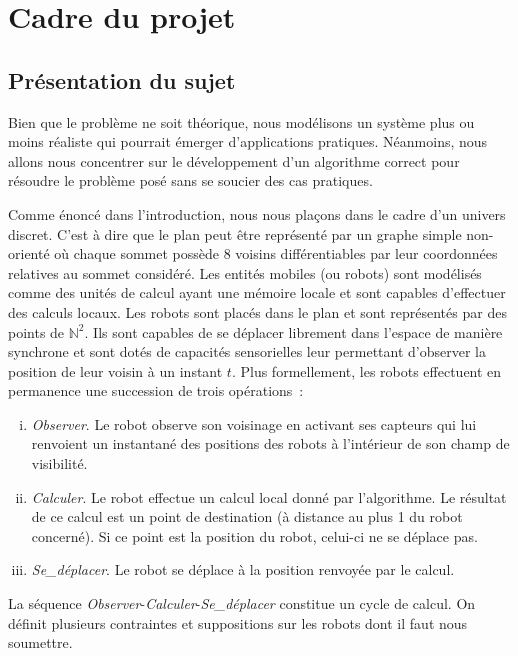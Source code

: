 \newcommand{\Observer}{\textit{Observer}\xspace}
\newcommand{\Calculer}{\textit{Calculer}\xspace}
\newcommand{\SeDeplacer}{\textit{Se\_déplacer}\xspace}

\section{Cadre du projet}

\subsection{Présentation du sujet}

Bien que le problème ne soit théorique, nous modélisons un système plus ou
moins réaliste qui pourrait émerger d'applications pratiques. Néanmoins, nous
allons nous concentrer sur le développement d'un algorithme correct pour
résoudre le problème posé sans se soucier des cas pratiques.

Comme énoncé dans l'introduction, nous nous plaçons dans le cadre d'un univers
discret. C'est à dire que le plan peut être représenté par un graphe simple
non-orienté où chaque sommet possède 8 voisins différentiables par leur
coordonnées relatives au sommet considéré. Les entités mobiles (ou robots) sont
modélisés comme des unités de calcul ayant une mémoire locale et sont capables
d'effectuer des calculs locaux. Les robots sont placés dans le plan et sont
représentés par des points de $\mathbb{N}^2$. Ils sont capables de se déplacer
librement dans l'espace de manière synchrone et sont dotés de capacités
sensorielles leur permettant d'observer la position de leur voisin à un instant
$t$. Plus formellement, les robots effectuent en permanence une succession de
trois opérations~:
\begin{enumerate}[(i)]
  \item \Observer. Le robot observe son voisinage en activant ses
  capteurs qui lui renvoient un instantané des positions des robots à
  l'intérieur de son champ de visibilité.
  \item \Calculer. Le robot effectue un calcul local donné par
  l'algorithme. Le résultat de ce calcul est un point de destination (à
  distance au plus 1 du robot concerné). Si ce point est la position du robot,
  celui-ci ne se déplace pas.
  \item \SeDeplacer. Le robot se déplace à la position renvoyée par le
  calcul. \\
\end{enumerate}
La séquence \Observer-\Calculer-\SeDeplacer constitue un cycle de calcul. On
définit plusieurs contraintes et suppositions sur les robots dont il faut nous
soumettre.

